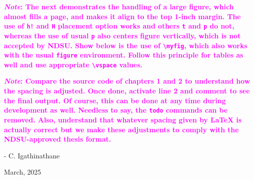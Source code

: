 \documentclass[12pt,mathdesign,showframe,showgrid]{ndsu-thesis-2022}
\begin{document}

\vspace{-0.2in}%
\kant[14]





\vspace{-0.2in}%
\kant[9]

{\bfseries
\textcolor{magenta}{\emph{Note}: The next demonstrates the handling of a large figure, which almost fills a page, and makes it align to the top 1-inch margin. The use of \texttt{h!} and \texttt{H} placement option works and others \texttt{t} and \texttt{p} do not, whereas the use of usual \texttt{p} also centers figure vertically, which is not accepted by NDSU. Show below is the use of \texttt{\textbackslash myfig}, which also works with the usual \texttt{figure} environment. Follow this principle for tables as well and use appropriate \texttt{\textbackslash vspace} values. }
}


\newpage
{}


{\bfseries
\textcolor{magenta}{\emph{Note}: Compare the source code of chapters 1 and 2 to understand how the spacing is adjusted. Once done, activate line 2 and comment to see the final output. Of course, this can be done at any time during development as well. Needless to say, the \texttt{todo} commands can be removed. Also, understand that whatever spacing given by \LaTeX{} is actually correct but we make these adjustments to comply with the NDSU-approved thesis format.}
}

\hfill{\small - C. Igathinathane}

\vspace{-0.1in}
\hfill{\scriptsize March, 2025}
\end{document}
